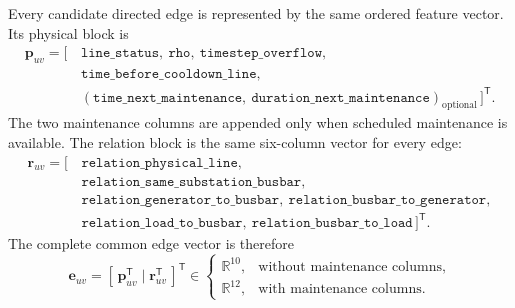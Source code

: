 Every candidate directed edge is represented by the same ordered feature
vector. Its physical block is
\begin{equation}
  \begin{split}
  \mathbf{p}_{uv} = [\,&
  \texttt{line\_status},\
  \texttt{rho},\
  \texttt{timestep\_overflow},\\
  &\texttt{time\_before\_cooldown\_line},\\
  &
  (\texttt{time\_next\_maintenance},\
  \texttt{duration\_next\_maintenance})_{\mathrm{optional}}
  \,]^{\mathsf T}.
  \end{split}
  \label{eq:heterogeneous-common-edge-physical-block}
\end{equation}
The two maintenance columns are appended only when scheduled maintenance is
available. The relation block is the same six-column vector for every edge:
\begin{equation}
  \begin{split}
  \mathbf{r}_{uv} = [\,&
  \texttt{relation\_physical\_line},\\
  &\texttt{relation\_same\_substation\_busbar},\\
  &\texttt{relation\_generator\_to\_busbar},\
  \texttt{relation\_busbar\_to\_generator},\\
  &\texttt{relation\_load\_to\_busbar},\
  \texttt{relation\_busbar\_to\_load}
  \,]^{\mathsf T}.
  \end{split}
  \label{eq:heterogeneous-common-edge-relation-block}
\end{equation}
The complete common edge vector is therefore
\begin{equation}
  \mathbf{e}_{uv}
  = [\,\mathbf{p}_{uv}^{\mathsf T}\mid
       \mathbf{r}_{uv}^{\mathsf T}\,]^{\mathsf T}
  \in
  \begin{cases}
    \mathbb{R}^{10}, & \text{without maintenance columns},\\
    \mathbb{R}^{12}, & \text{with maintenance columns}.
  \end{cases}
  \label{eq:heterogeneous-common-edge-vector}
\end{equation}
